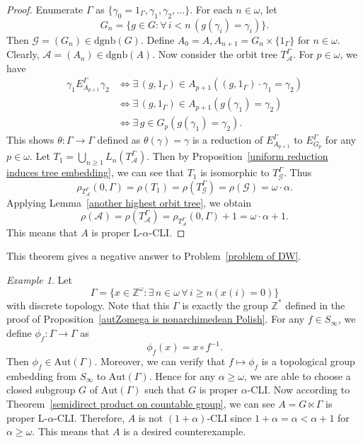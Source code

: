 \documentclass[11pt]{amsart}
\theoremstyle{definition}
\theoremstyle{remark}
\newtheorem{example}[theorem]{Example}
\numberwithin{equation}{section}
\def\Z {{\mathbb{Z}}}
\def\dgnb{{\mathrm{dgnb}}}
\def\hier#1{$#1$-CLI}
\def\otr#1#2{T_{\mathcal{#1}}^{#2}}
\def\aut{{\mathrm{Aut}}}
\def\dsZ{{\Z^*}}
\begin{document}
\begin{proof}
    Enumerate $\Gamma$ as $\{\gamma_0=1_\Gamma,\gamma_1,\gamma_2,\dots\}$. For each $n\in\omega$, let
    $$G_n=\{g\in G:\forall\,i<n\,(g(\gamma_i)=\gamma_i)\}.$$
    Then $\mathcal{G}=(G_n)\in\dgnb(G)$. Define $A_0=A, A_{n+1}=G_n\times\{1_\Gamma\}$ for $n\in\omega$. Clearly, $\mathcal{A}=(A_n)\in\dgnb(A)$. Now consider the orbit tree $\otr{A}{\Gamma}$. For $p\in\omega$, we have
    \begin{align*}
        \gamma_1E_{A_{p+1}}^\Gamma\gamma_2&\iff\exists\,(g,1_\Gamma)\in A_{p+1}\left((g,1_\Gamma)\cdot\gamma_1=\gamma_2\right)\\
        &\iff\exists\,(g,1_\Gamma)\in A_{p+1}\left(g(\gamma_1)=\gamma_2\right)\\
        &\iff\exists\,g\in G_p\left(g(\gamma_1)=\gamma_2\right).
    \end{align*}
    This shows $\theta:\Gamma\to\Gamma$ defined as $\theta(\gamma)=\gamma$ is a reduction of $E_{A_{p+1}}^\Gamma$ to $E_{G_p}^\Gamma$ for any $p\in\omega$. Let $T_1=\bigcup_{n\geq 1}L_n(\otr{A}{\Gamma})$. Then by Proposition~\ref{uniform reduction induces tree embedding}, we can see that $T_1$ is isomorphic to $\otr{G}{\Gamma}$.
    Thus
    $$\rho_{\otr{A}{\Gamma}}(0,\Gamma)=\rho(T_1)=\rho(\otr{G}{\Gamma})=\rho(\mathcal{G})=\omega\cdot\alpha.$$
    Applying Lemma~\ref{another highest orbit tree}, we obtain
    $$\rho(\mathcal{A})=\rho(\otr{A}{\Gamma})=\rho_{\otr{A}{\Gamma}}(0,\Gamma)+1=\omega\cdot\alpha+1.$$
    This means that $A$ is proper L-\hier\alpha.
\end{proof}

This theorem gives a negative answer to Problem~\ref{problem of DW}.

\begin{example}\label{counterexample of ctb group}
Let
$$\Gamma=\{x\in\Z^\omega:\exists\,n\in\omega\,\forall\,i\geq n\left(x(i)=0\right)\}$$
with discrete topology. Note that this $\Gamma$ is exactly the group $\dsZ$ defined in the proof of Proposition~\ref{autZomega is nonarchimedean Polish}. For any $f\in S_\infty$, we define $\phi_f:\Gamma\to\Gamma$ as
$$\phi_f(x)=x\circ f^{-1}.$$
Then $\phi_f\in\aut(\Gamma)$. Moreover, we can verify that $f\mapsto\phi_f$ is a topological group embedding from $S_\infty$ to $\aut(\Gamma)$. Hence for any $\alpha\geq\omega$, we are able to choose a closed subgroup $G$ of $\aut(\Gamma)$ such that $G$ is proper \hier\alpha. Now according to Theorem~\ref{semidirect product on countable group}, we can see $A=G\ltimes\Gamma$ is proper L-\hier\alpha. Therefore, $A$ is not \hier{(1+\alpha)} since $1+\alpha=\alpha<\alpha+1$ for $\alpha\geq\omega$. This means that $A$ is a desired counterexample.
\end{example}
\end{document}
